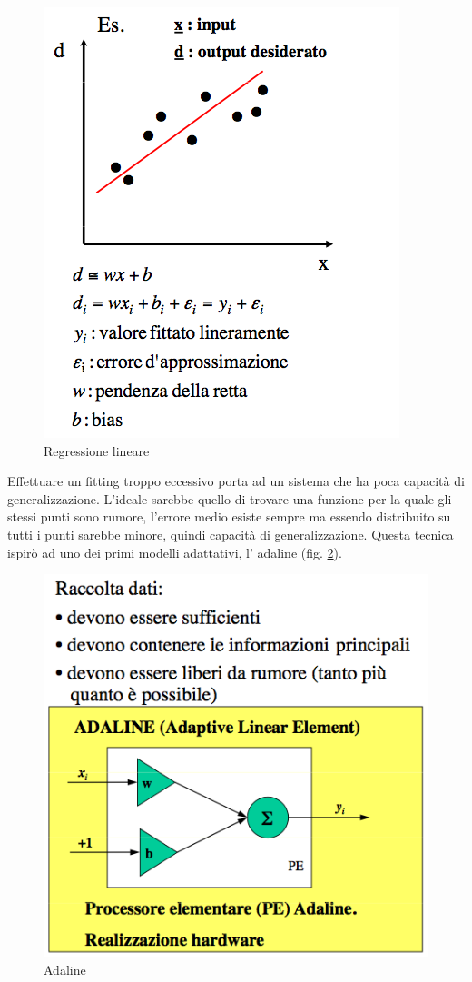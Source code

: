 \begin{figure}
\centering
\includegraphics[scale=0.6]{img/regressione.png}
\caption{Regressione lineare}
\label{regressione}
\end{figure}
Effettuare un fitting troppo eccessivo porta ad un sistema che ha poca capacità di generalizzazione. L'ideale sarebbe quello di trovare una funzione per la quale gli stessi punti sono rumore, l'errore medio esiste sempre ma essendo distribuito su tutti i punti sarebbe minore, quindi capacità di generalizzazione. Questa tecnica ispirò ad uno dei primi modelli adattativi, l' adaline (fig. \ref{adaline}).
\begin{figure}
\centering
\includegraphics[scale=0.5]{img/adaline.png}
\caption{Adaline}
\label{adaline}
\end{figure}
